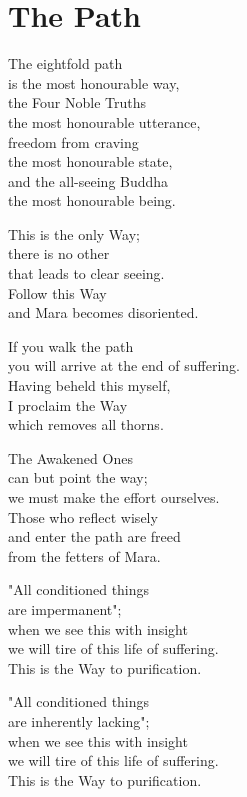 
\chapter{The Path}


The eightfold path\\
is the most honourable way,\\
the Four Noble Truths\\
the most honourable utterance,\\
freedom from craving\\
the most honourable state,\\
and the all-seeing Buddha\\
the most honourable being.


This is the only Way;\\
there is no other\\
that leads to clear seeing.\\
Follow this Way\\
and Mara becomes disoriented.


If you walk the path\\
you will arrive at the end of suffering.\\
Having beheld this myself,\\
I proclaim the Way\\
which removes all thorns.


The Awakened Ones\\
can but point the way;\\
we must make the effort ourselves.\\
Those who reflect wisely\\
and enter the path are freed\\
from the fetters of Mara.


"All conditioned things\\
are impermanent";\\
when we see this with insight\\
we will tire of this life of suffering.\\
This is the Way to purification.


"All conditioned things\\
are inherently lacking";\\
when we see this with insight\\
we will tire of this life of suffering.\\
This is the Way to purification.


